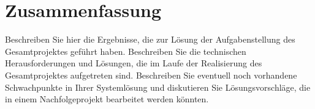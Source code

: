 \chapter{Zusammenfassung}

Beschreiben Sie hier die Ergebnisse, die zur Lösung der Aufgabenstellung des Gesamtprojektes geführt haben.
Beschreiben Sie die technischen Herausforderungen und Lösungen, die im Laufe der Realisierung des Gesamtprojektes aufgetreten sind. 
Beschreiben Sie eventuell noch vorhandene Schwachpunkte in Ihrer Systemlösung und diskutieren Sie Lösungsvorschläge, die in einem Nachfolgeprojekt bearbeitet werden könnten.
